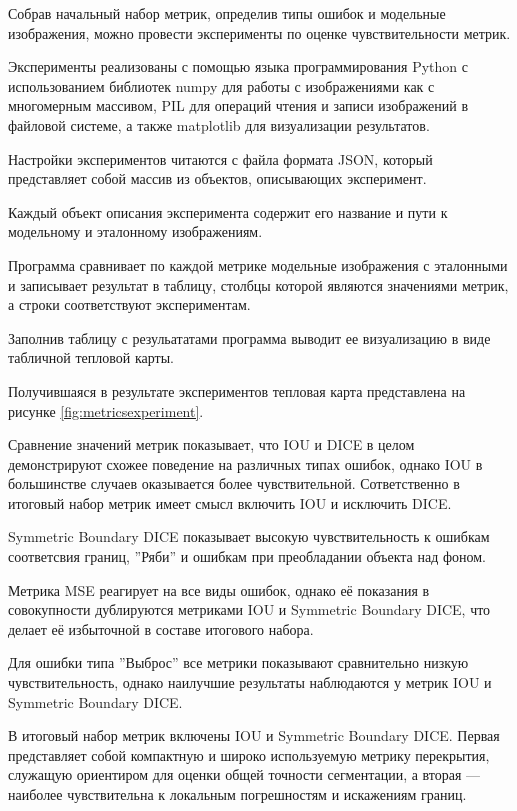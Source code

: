 Собрав начальный набор метрик, определив типы ошибок и модельные изображения, можно провести эксперименты по оценке чувствительности метрик.

Эксперименты реализованы с помощью языка программирования Python с использованием библиотек numpy для работы с изображениями как с многомерным массивом, PIL для операций чтения и записи изображений в файловой системе, а также matplotlib для визуализации результатов.

Настройки экспериментов читаются с файла формата JSON, который представляет собой массив из объектов, описывающих эксперимент. 

Каждый объект описания эксперимента содержит его название и пути к модельному и эталонному изображениям.

Программа сравнивает по каждой метрике модельные изображения с эталонными и записывает результат в таблицу, столбцы которой являются значениями метрик, а строки соответствуют экспериментам.

Заполнив таблицу с резульататами программа выводит ее визуализацию в виде табличной тепловой карты.

Получившаяся в результате экспериментов тепловая карта представлена на рисунке \ref{fig:metricsexperiment}.


Сравнение значений метрик показывает, что IOU и DICE в целом демонстрируют схожее поведение на различных типах ошибок, однако IOU в большинстве случаев оказывается более чувствительной. Сответственно в итоговый набор метрик имеет смысл включить IOU и исключить DICE.

Symmetric Boundary DICE показывает высокую чувствительность к ошибкам соответсвия границ, ''Ряби'' и ошибкам при преобладании объекта над фоном. 

Метрика MSE реагирует на все виды ошибок, однако её показания в совокупности дублируются метриками IOU и Symmetric Boundary DICE, что делает её избыточной в составе итогового набора.

Для ошибки типа ''Выброс'' все метрики показывают сравнительно низкую чувствительность, однако наилучшие результаты наблюдаются у метрик IOU и Symmetric Boundary DICE.

В итоговый набор метрик включены IOU и Symmetric Boundary DICE. Первая представляет собой компактную и широко используемую метрику перекрытия, служащую ориентиром для оценки общей точности сегментации, а вторая — наиболее чувствительна к локальным погрешностям и искажениям границ.

